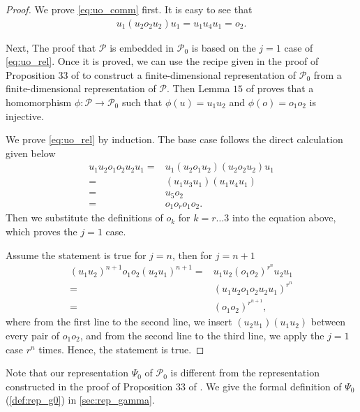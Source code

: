 \documentclass[11pt,letterpaper]{article}
\newcommand{\1}{\mathbb{1}}
\newcommand{\Pg}{\mathcal{P}}
\theoremstyle{definition}
\begin{document}
\begin{proof}
    We prove \cref{eq:uo_comm} first. It is easy to see that
    \begin{align}
        u_1 (u_2o_2u_2) u_1 = u_1u_4u_1 =o_2.
    \end{align}
    
    Next, The proof that $\Pg$ is embedded in $\Pg_0$ is based on
    the $j = 1$ case of \cref{eq:uo_rel}.
    Once it is proved, we can use the recipe given in
    the proof of Proposition $33$ of \cite{slofstra2017} 
    to construct a finite-dimensional representation of $\Pg_0$ from a 
    finite-dimensional representation of $\Pg$. 
    Then Lemma $15$ of \cite{slofstra2017}
    proves that a homomorphism $\phi: \Pg \rightarrow \Pg_0$ such that $\phi(u) = u_1u_2$ and 
    $\phi(o) = o_1o_2$ is injective.
    
	We prove \cref{eq:uo_rel} by induction.
	The base case follows the direct calculation given below
	\begin{align*} 
		u_1u_2 o_1o_2 u_2u_1 = &u_1 (u_2 o_1u_2) (u_2o_2 u_2) u_1 \\
	=& (u_1 u_3 u_1) (u_1 u_4 u_1)\\
	=& u_5 o_2\\
	=& o_1o_ro_1 o_2.
	\end{align*}
	Then we substitute the definitions of $o_k$ for $k = r \dots 3$ into the equation above, which 
	proves the $j=1$ case.
	
	Assume the statement is true for $j = n$, then for $j = n+1$
	\begin{align*}
		(u_1u_2)^{n+1} o_1o_2 (u_2u_1)^{n+1} =& u_1u_2 (o_1o_2)^{r^n} u_2u_1 \\ 
		 =& (u_1u_2 o_1o_2 u_2u_1)^{r^n} \\
		 =& (o_1o_2)^{r^{n+1}},
	\end{align*}
	where from the first line to the second line, we insert $(u_2u_1)(u_1u_2)$ between every pair of $o_1o_2$, and
	from the second line to the third line, we apply the $j=1$ case
	$r^n$ times. Hence, the statement is true.
\end{proof}
Note that our representation $\Psi_0$ of $\Pg_0$ is different from the representation
constructed in the proof of Proposition $33$ of \cite{slofstra2017}.
We give the formal definition of $\Psi_0$ (\cref{def:rep_g0}) in \cref{sec:rep_gamma}.
\end{document}
